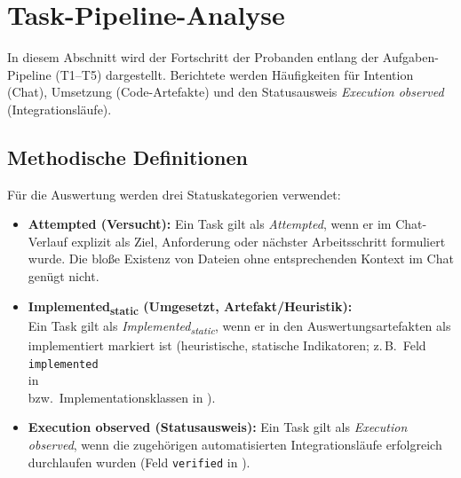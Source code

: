 \section{Task-Pipeline-Analyse}
\label{sec:results_pipeline}

In diesem Abschnitt wird der Fortschritt der Probanden entlang der Aufgaben-Pipeline (T1--T5) dargestellt. Berichtete werden Häufigkeiten für Intention (Chat), Umsetzung (Code-Artefakte) und den Statusausweis \textit{Execution observed} (Integrationsläufe).

\subsection{Methodische Definitionen}
Für die Auswertung werden drei Statuskategorien verwendet:
\begin{itemize}
    \item  \textbf{Attempted (Versucht):} Ein Task gilt als  \textit{Attempted}, wenn er im Chat-Verlauf explizit als Ziel, Anforderung oder nächster Arbeitsschritt formuliert wurde. Die bloße Existenz von Dateien ohne entsprechenden Kontext im Chat genügt nicht.
    \item  \textbf{Implemented\textsubscript{static} (Umgesetzt, Artefakt/Heuristik):}\\
    Ein Task gilt als  \textit{Implemented\textsubscript{static}}, wenn er in den Auswertungsartefakten als implementiert markiert ist (heuristische, statische Indikatoren; z.\,B.\ Feld \texttt{implemented}\\
    in \\
    bzw.\ Implementationsklassen in \mbox{}).
    \item  \textbf{Execution observed (Statusausweis):} Ein Task gilt als  \textit{Execution observed}, wenn die zugehörigen automatisierten Integrationsläufe erfolgreich durchlaufen wurden (Feld \texttt{verified} in ).
\end{itemize}

